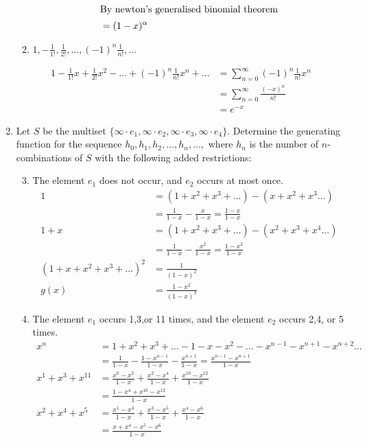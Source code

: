 \documentclass{article}
\begin{document}
\begin{enumerate}
\begin{enumerate}
\begin{align*}
  \intertext{By newton's generalised binomial theorem}
  &=(1-x)^\alpha\\
\end{align*}
\setcounter{enumii}{4}
\item
$1,-\frac{1}{1!},\frac{1}{2!},\dots,(-1)^n\frac{1}{n!},\dots$
\end{enumerate}
\begin{align*}
  1-\frac{1}{1!}x+\frac{1}{2!}x^2-\dots+(-1)^n\frac{1}{n!}x^n+\dots&=\sum\limits_{n=0}^\infty{(-1)^n\frac{1}{n!}x^n}\\
  &=\sum\limits_{n=0}^\infty{\frac{(-x)^n}{n!}}\\
  &=e^{-x}
\end{align*}
\item
Let $S$ be the multiset $\{\infty\cdot e_1,\infty\cdot e_2,\infty\cdot e_3,\infty\cdot e_4\}$. Determine the generating function for the sequence $h_0,h_1,h_2,\dots,h_n,\dots,$ where $h_n$ is the number of $n$-combinations of $S$ with the following added restrictions:
\begin{enumerate}
\setcounter{enumii}{2}
\item
The element $e_1$ does not occur, and $e_2$ occurs at most once.
\begin{align*}
  1&=(1+x^2+x^3+\dots)-(x+x^2+x^3\dots)\\
  &=\frac{1}{1-x}-\frac{x}{1-x}=\frac{1-x}{1-x}\\
  1+x&=(1+x^2+x^3+\dots)-(x^2+x^3+x^4\dots)\\
  &=\frac{1}{1-x}-\frac{x^2}{1-x}=\frac{1-x^2}{1-x}\\
  (1+x+x^2+x^3+\dots)^2&=\frac{1}{(1-x)^2}\\
  g(x)&=\frac{1-x^2}{(1-x)^3}
\end{align*}
\item
The element $e_1$ occurs 1,3,or 11 times, and the element $e_2$ occurs 2,4, or 5 times.
\begin{align*}
  x^n&=1+x^2+x^3+\dots-1-x-x^2-\dots-x^{n-1}-x^{n+1}-x^{n+2}\dots\\
  &=\frac{1}{1-x}-\frac{1-x^{n-1}}{1-x}-\frac{x^{n+1}}{1-x}=\frac{x^{n-1}-x^{n+1}}{1-x}\\
  x^1+x^3+x^{11}&=\frac{x^0-x^2}{1-x}+\frac{x^2-x^4}{1-x}+\frac{x^{10}-x^{12}}{1-x}\\
  &=\frac{1-x^4+x^{10}-x^{12}}{1-x}\\
  x^2+x^4+x^5&=\frac{x^1-x^3}{1-x}+\frac{x^3-x^5}{1-x}+\frac{x^4-x^6}{1-x}\\
  &=\frac{x+x^4-x^5-x^6}{1-x}\\

\end{align*}
\end{enumerate}
\end{enumerate}
\end{document}
